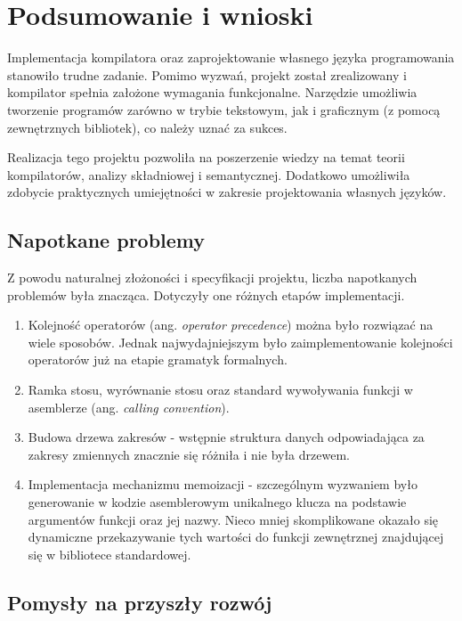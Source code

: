 \chapter{Podsumowanie i wnioski}
\label{ch:07}

Implementacja kompilatora oraz zaprojektowanie własnego języka programowania stanowiło trudne zadanie. Pomimo wyzwań, projekt został zrealizowany i kompilator spełnia założone wymagania funkcjonalne. Narzędzie umożliwia tworzenie programów zarówno w trybie tekstowym, jak i graficznym (z pomocą zewnętrznych bibliotek), co należy uznać za sukces.

Realizacja tego projektu pozwoliła na poszerzenie wiedzy na temat teorii kompilatorów, analizy składniowej i semantycznej. Dodatkowo umożliwiła zdobycie praktycznych umiejętności w zakresie projektowania własnych języków.

\section{Napotkane problemy}

Z powodu naturalnej złożoności i specyfikacji projektu, liczba napotkanych problemów była znacząca. Dotyczyły one różnych etapów implementacji.

\begin{enumerate}
    \item Kolejność operatorów (ang. \textit{operator precedence}) można było rozwiązać na wiele sposobów. Jednak najwydajniejszym było zaimplementowanie kolejności operatorów już na etapie gramatyk formalnych.
    \item Ramka stosu, wyrównanie stosu oraz standard wywoływania funkcji w asemblerze (ang. \textit{calling convention}).
    \item Budowa drzewa zakresów - wstępnie struktura danych odpowiadająca za zakresy zmiennych znacznie się różniła i nie była drzewem.
    \item Implementacja mechanizmu memoizacji - szczególnym wyzwaniem było generowanie w kodzie asemblerowym unikalnego klucza na podstawie argumentów funkcji oraz jej nazwy. Nieco mniej skomplikowane okazało się dynamiczne przekazywanie tych wartości do funkcji zewnętrznej znajdującej się w bibliotece standardowej.
\end{enumerate}

\section{Pomysły na przyszły rozwój}

